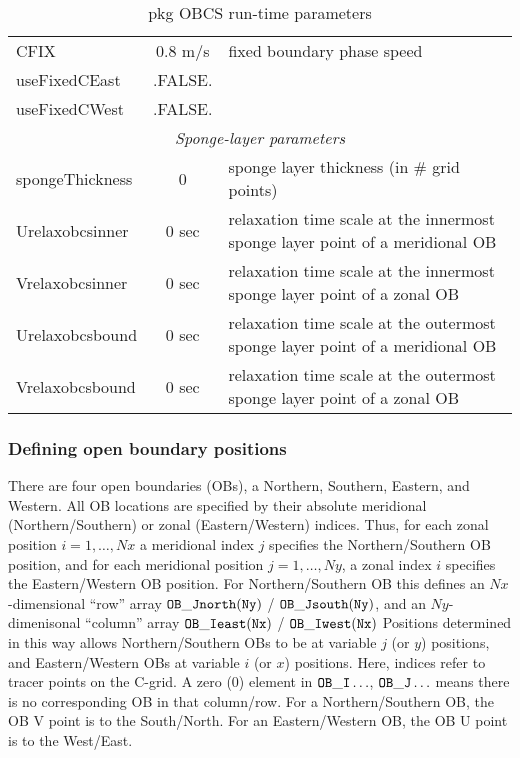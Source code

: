 \begin{table}[!ht]
{\begin{tabular}{|l|c|l|}
        CFIX & 0.8 m/s & 
           fixed boundary phase speed \\
        useFixedCEast & .FALSE. & 
           ~ \\
        useFixedCWest & .FALSE. & 
           ~ \\
      \hline
      \multicolumn{3}{|c|}{\textit{Sponge-layer parameters} } \\
      \hline
        spongeThickness & 0 & 
           sponge layer thickness (in \# grid points) \\
        Urelaxobcsinner & 0 sec & 
           relaxation time scale at the 
           innermost sponge layer point of a meridional OB \\
        Vrelaxobcsinner & 0 sec & 
           relaxation time scale at the 
           innermost sponge layer point of a zonal OB \\
        Urelaxobcsbound & 0 sec & 
           relaxation time scale at the 
           outermost sponge layer point of a meridional OB \\
        Vrelaxobcsbound & 0 sec & 
           relaxation time scale at the 
           outermost sponge layer point of a zonal OB \\
         \hline
      \hline
    \end{tabular}
  }
  \caption{pkg OBCS run-time parameters}
  \label{tab:pkg:obcs:runtime_flags}
\end{table}




\subsubsection{Defining open boundary positions
\label{sec:pkg:obcs:defining}}

There are four open boundaries (OBs), a 
Northern, Southern, Eastern, and Western.
All OB locations are specified by their absolute
meridional (Northern/Southern) or zonal (Eastern/Western) indices.
Thus, for each zonal position $i=1,\ldots,Nx$ a meridional index
$j$ specifies the Northern/Southern OB position,
and for each meridional position $j=1,\ldots,Ny$, a zonal index
$i$ specifies the Eastern/Western OB position.
For Northern/Southern OB this defines an $Nx$-dimensional
``row'' array $\tt OB\_Jnorth(Ny)$ / $\tt OB\_Jsouth(Ny)$,
and an $Ny$-dimenisonal 
``column'' array $\tt OB\_Ieast(Nx)$ / $\tt OB\_Iwest(Nx)$
Positions determined in this way allows Northern/Southern
OBs to be at variable $j$ (or $y$) positions, and Eastern/Western
OBs at variable $i$ (or $x$) positions.
Here, indices refer to tracer points on the C-grid.
A zero (0) element in $\tt OB\_I\ldots$, $\tt OB\_J\ldots$
means there is no corresponding OB in that column/row.
For a Northern/Southern OB, the OB V point is to the South/North.
For an Eastern/Western OB, the OB U point is to the West/East.

